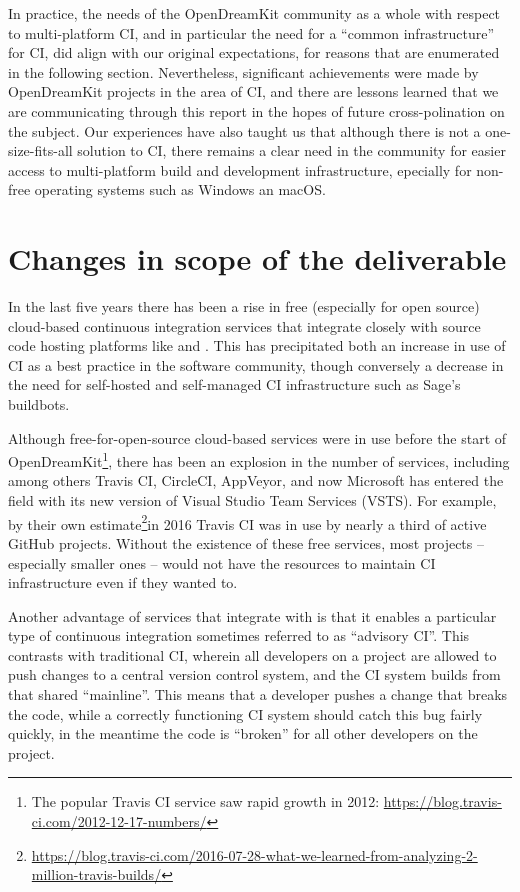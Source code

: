 \documentclass{deliverablereport}
\begin{document}
In practice, the needs of the OpenDreamKit community as a whole with respect to
multi-platform CI, and in particular the need for a ``common infrastructure''
for CI, did align with our original expectations, for reasons that are
enumerated in the following section.  Nevertheless, significant achievements were made by OpenDreamKit
projects in the area of CI, and there are lessons learned that we are
communicating through this report in the hopes of future
cross-polination on the subject.  Our experiences have
also taught us that although there is not a one-size-fits-all solution to CI,
there remains a clear need in the community for easier access to multi-platform
build and development infrastructure, epecially for non-free operating systems
such as Windows an macOS.

\hypertarget{changes-to-deliverable}{%
\section{Changes in scope of the deliverable}\label{changes-to-deliverable}}

In the last five years there has been a rise in free (especially for open
source) cloud-based continuous integration services that integrate closely with
source code hosting platforms like \GitHub and \GitLab.  This has precipitated
both an increase in use of CI as a best practice in the software community,
though conversely a decrease in the need for self-hosted and self-managed CI
infrastructure such as Sage's buildbots.

Although free-for-open-source cloud-based services were in use before the start
of OpenDreamKit\footnote{The popular Travis CI service saw rapid growth in
2012: \url{https://blog.travis-ci.com/2012-12-17-numbers/}}, there has been an
explosion in the number of services, including among others Travis CI,
CircleCI, AppVeyor, and now Microsoft has entered the field with its new
version of Visual Studio Team Services (VSTS).  For example, by their own
estimate\footnote{\url{https://blog.travis-ci.com/2016-07-28-what-we-learned-from-analyzing-2-million-travis-builds/}}in
2016 Travis CI was in use by nearly a third of active GitHub projects.  Without
the existence of these free services, most projects -- especially smaller
ones -- would not have the resources to maintain CI infrastructure even if they
wanted to.

Another advantage of services that integrate with \GitHub is that it enables a
particular type of continuous integration sometimes referred to as ``advisory
CI''.  This contrasts with traditional CI, wherein all developers on a project
are allowed to push changes to a central version control system, and the CI
system builds from that shared ``mainline''.  This means that a developer
pushes a change that breaks the code, while a correctly functioning CI system
should catch this bug fairly quickly, in the meantime the code is ``broken''
for all other developers on the project.
\end{document}
